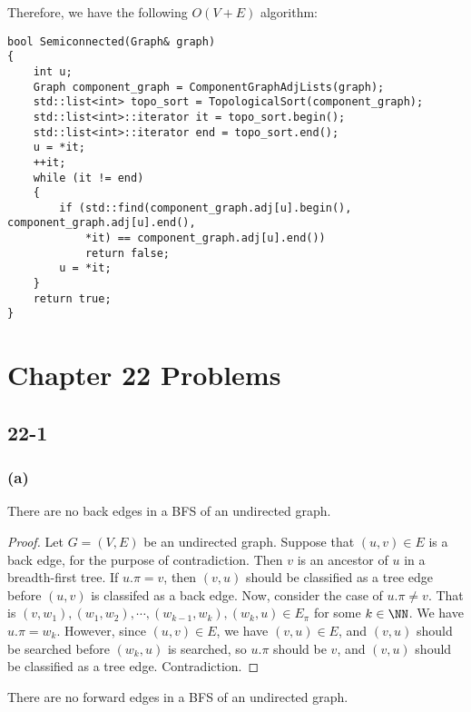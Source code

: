 Therefore, we have the following $O(V + E)$ algorithm:

\begin{verbatim}
bool Semiconnected(Graph& graph)
{
    int u;
    Graph component_graph = ComponentGraphAdjLists(graph);
    std::list<int> topo_sort = TopologicalSort(component_graph);
    std::list<int>::iterator it = topo_sort.begin();
    std::list<int>::iterator end = topo_sort.end();
    u = *it;
    ++it;
    while (it != end)
    {
        if (std::find(component_graph.adj[u].begin(), component_graph.adj[u].end(), 
            *it) == component_graph.adj[u].end())
            return false;
        u = *it;
    }
    return true;
}
\end{verbatim}

\section*{Chapter 22 Problems}

\subsection*{22-1}

\subsubsection*{(a)}

\begin{claim}
    There are no back edges in a BFS of an undirected graph.
\end{claim}

\begin{proof}
    Let $G = (V,E)$ be an undirected graph.
    Suppose that $(u,v) \in E$ is a back edge, for the purpose of contradiction.
    Then $v$ is an ancestor of $u$ in a breadth-first tree.
    If $u.\pi = v$, then $(v,u)$ should be classified as a tree edge
    before $(u,v)$ is classifed as a back edge.
    Now, consider the case of $u.\pi \neq v$.
    That is $(v,w_1), (w_1,w_2), \cdots, (w_{k-1},w_k), (w_k, u) \in E_\pi$
    for some $k \in \NN$.
    We have $u.\pi = w_k$.
    However, since $(u,v) \in E$, we have $(v,u) \in E$,
    and $(v,u)$ should be searched before $(w_k, u)$ is searched,
    so $u.\pi$ should be $v$, and $(v,u)$ should be classified as a tree edge.
    Contradiction.
\end{proof}

\begin{claim}
    There are no forward edges in a BFS of an undirected graph.
\end{claim}

